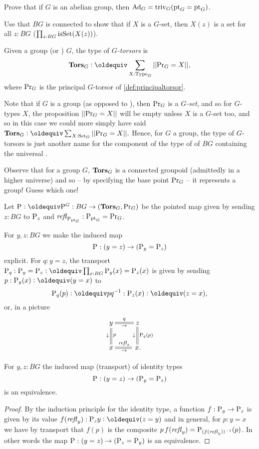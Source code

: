 \begin{xca}
  Prove that if $G$ is an abelian group, then $\mathrm{Ad}_G=\mathrm{triv}_G({\mathord{\mathrm{pt}}}_G={\mathord{\mathrm{pt}}}_G)$.
\end{xca}
\begin{xca}
  Use that $BG$ is connected to show that if $X$ is a $G$-set, then $X(z)$ is a set for all $z:BG$ (\ie $\prod_{z:BG}\mathrm{isSet}(X(z))$).
\end{xca}
\begin{definition}
  Given a group (or \inftygp) $G$, the type of {\em$G$-torsors} is
$$\typetorsor_G\defequi\sum_{X:\Type_G}||\princ G=X||,$$
where $\mathrm{Pr}_{{G}}$ is the principal $G$-torsor of \cref{def:principaltorsor}.
\end{definition}
\begin{remark}
  Note that if $G$ is a group (as opposed to \aninftygp), then $\mathrm{Pr}_{{G}}$ is a $G${\em-set}, and so for $G$-types $X$, the proposition $||\mathrm{Pr}_{{G}}=X||$ will be empty unless $X$ is a $G$-set too, and so in this case we could more simply have said $\typetorsor_G\defequi\sum_{X:\Set_G}||\princ G=X||.$  
Hence, for $G$ a group, the type of $G$-torsors is just another name for the component of the type of \coverings of $BG$ containing the universal \covering.

Observe that for a group $G$, $\mathbf{Tors}_G$ is a connected groupoid (admittedly in a higher universe) and so -- by specifying the base point $\mathrm{Pr}_{{G}}$ -- it represents a group!  Guess which one!
\end{remark}
\begin{definition}
  \label{def:BG2TorsG}
  Let $\pathsp{}\defequi\pathsp{}^G:BG\to(\typetorsor_G,\princ G)$ be the pointed map given by sending $z:BG$ to $\mathrm{P}_{z}$ and $\mathop{{\it refl}_{\mathrm{P}_{{\mathord{\mathrm{pt}}}_G}}}:\mathrm{P}_{{\mathord{\mathrm{pt}}}_G}=\mathrm{Pr}_{{G}}$. 
\end{definition}

\begin{example}\label{ex:pathsptransport}
  For $y,z:BG$ we make the induced map
$$\mathrm{P}_{}:(y=z)\to (\mathrm{P}_{y}=\mathrm{P}_{z})
$$
explicit.  For $q:y=z$,  the transport $\pathsp q:\pathsp y=\pathsp z\defequi\prod_{x:BG}\pathsp y(x)=\pathsp z(x)$ is given by sending $p:\pathsp y(x)\defequi (y=x)$ to
$$\pathsp q(p)\defequi pq^{-1}:\pathsp z(x)\defequi(z=x),$$ 
or, in a picture 
$$\xymatrix{y\ar@{=}[r]^q_\to\ar@{=}[d]^{p}_\downarrow&z\ar@{=}[d]^{\pathsp q(p)}_\downarrow\\
x\ar@{=}[r]^{\refl x}_\to&\,x.}$$
\end{example}
\begin{lemma}\label{lem:pathsptransportiseq}
  For  $y,z:BG$ the induced map  (\ie transport) of identity types
$$\mathrm{P}_{}:(y=z)\to (\mathrm{P}_{y}=\mathrm{P}_{z})
$$
is an equivalence.
\end{lemma}
\begin{proof}
 By the induction principle for the identity type,  
a function $f:\mathrm{P}_{y}\to \mathrm{P}_{z}$ is given by its value $f(\refl y):\pathsp zy\defequi (z=y)$ and in general, for $p:y= x$ we have by transport that $f(p)$ is the composite $p\,f(\mathop{{\it refl}_{y}})=\mathrm{P}_{(f(\mathop{{\it refl}_{y}}))^{-1}}(p)$.  
In other words the map $\mathrm{P}_{}:(y=z)\to(\mathrm{P}_{z}=\mathrm{P}_{y})$ is an equivalence.
\end{proof}


